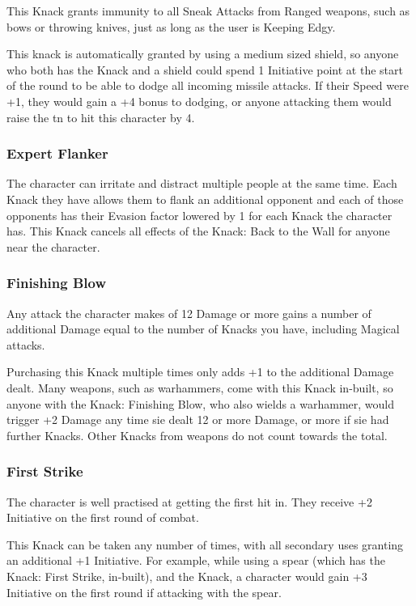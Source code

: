 \documentclass[titlepage,a4paper,openany]{book}
\begin{document}
\begin{multicols}{2}
This Knack grants immunity to all Sneak Attacks from Ranged weapons, such as bows or throwing knives, just as long as the user is Keeping Edgy.

This knack is automatically granted by using a medium sized shield, so anyone who both has the Knack and a shield could spend 1 Initiative point at the start of the \gls{round} to be able to dodge all incoming missile attacks. If their Speed were +1, they would gain a +4 bonus to dodging, or anyone attacking them would raise the \gls{tn} to hit this character by 4.

\subsubsection{Expert Flanker}

The character can irritate and distract multiple people at the same time. Each Knack they have allows them to flank an additional opponent and each of those opponents has their Evasion factor lowered by 1 for each Knack the character has. This Knack cancels all effects of the Knack: Back to the Wall for anyone near the character.

\subsubsection{Finishing Blow}\label{finishingblow}

Any attack the character makes of 12 Damage or more gains a number of additional Damage equal to the number of Knacks you have, including Magical attacks.

Purchasing this Knack multiple times only adds +1 to the additional Damage dealt. Many weapons, such as warhammers, come with this Knack in-built, so anyone with the Knack: Finishing Blow, who also wields a warhammer, would trigger +2 Damage any time sie dealt 12 or more Damage, or more if sie had further Knacks. Other Knacks from weapons do not count towards the total.

\subsubsection{First Strike}\label{firststrike}

The character is well practised at getting the first hit in. They receive +2 Initiative on the first \gls{round} of combat.

This Knack can be taken any number of times, with all secondary uses granting an additional +1 Initiative. For example, while using a spear (which has the Knack: First Strike, in-built), and the Knack, a character would gain +3 Initiative on the first \gls{round} if attacking with the spear.


\end{multicols}
\end{document}
